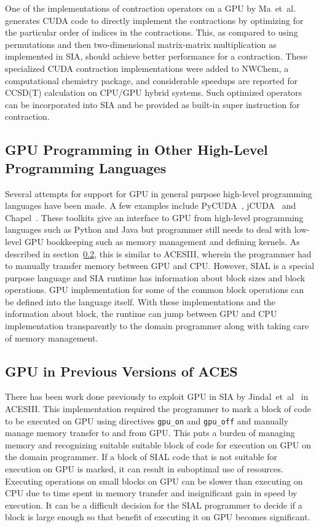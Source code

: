 One of the implementations of contraction operators on a GPU by
Ma~et~al.~\cite{Ma2013} generates CUDA code to directly implement the contractions
by optimizing for the particular order of indices in the contractions. This, as
compared to using permutations and then two-dimensional matrix-matrix multiplication
as implemented in SIA, should achieve better performance for a contraction. These
specialized CUDA contraction implementations were added to NWChem, a computational
chemistry package, and considerable speedups are reported for CCSD(T) calculation
on CPU/GPU hybrid systems. Such optimized operators can be incorporated into SIA
and be provided as built-in super instruction for contraction.

\subsection{GPU Programming in Other High-Level Programming Languages}
Several attempts for support for GPU in general purpose high-level programming
languages have been made. A few examples include PyCUDA~\cite{pycuda2011},
jCUDA~\cite{jcuda2009} and Chapel~\cite{chapelgpu}. These toolkits give an interface
to GPU from high-level programming languages such as Python and Java but
programmer still needs to deal with low-level GPU bookkeeping such as memory
management and defining kernels. As described in section~\ref{relatedworkacesiiigpu},
this is similar to ACESIII, wherein the programmer had to manually transfer memory
between GPU and CPU. However, SIAL is a special purpose language and SIA runtime
has information about block sizes and block operations. GPU implementation for
some of the common block operations can be defined into the language itself. With
these implementations and the information about block, the runtime can jump between
GPU and CPU implementation transparently to the domain programmer along with taking
care of memory management.

\subsection{GPU in Previous Versions of ACES}\label{relatedworkacesiiigpu}
There has been work done previously to exploit GPU in SIA
by Jindal~et~al~\cite{Jindal2016} in ACESIII. This implementation
required the programmer to mark a block of code to be executed on GPU using
directives \texttt{gpu\_on} and \texttt{gpu\_off} and manually manage memory
transfer to and from GPU. This puts a burden of managing memory and recognizing
suitable suitable block of code for execution on GPU on the domain programmer.
If a block of SIAL code that is not suitable for execution on GPU is marked, it can result
in suboptimal use of resources. Executing operations on small blocks on GPU can
be slower than executing on CPU due to time spent in memory transfer and
insignificant gain in speed by execution. It can be a difficult decision for the
SIAL programmer to decide if a block is large enough so that benefit of executing
it on GPU becomes significant.


